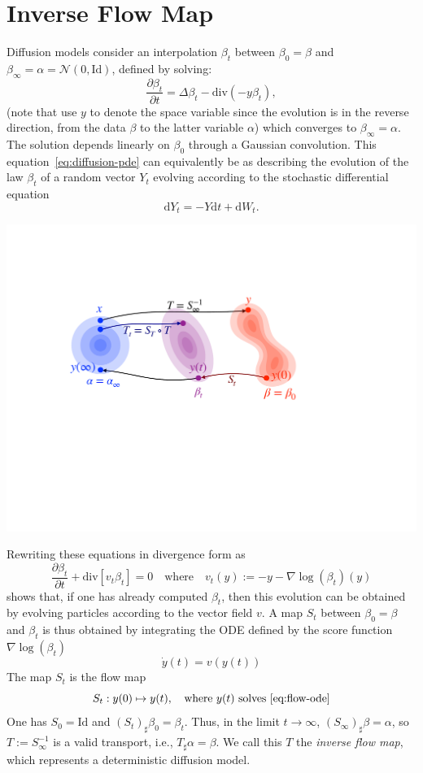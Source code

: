 \documentclass{article}
\begin{document}
\section{Inverse Flow Map}

Diffusion models consider an interpolation $\beta_t$ between $\beta_0 = \beta$ and $\beta_\infty = \alpha = \mathcal{N}(0,\text{Id})$, defined by solving:
\begin{equation}\label{eq:diffusion-pde}
    \frac{\partial \beta_t}{\partial t} = \Delta \beta_t - \text{div}(-y \beta_t) ,
\end{equation}
(note that use $y$ to denote the space variable since the evolution is in the reverse direction, from the data $\beta$ to the latter variable $\alpha$) which converges to $\beta_\infty = \alpha$. The solution depends linearly on $\beta_0$ through a Gaussian convolution.
%
This equation~\eqref{eq:diffusion-pde} can equivalently be as describing the evolution of the law $\beta_t$ of a random vector $Y_t$ evolving according to the stochastic differential equation
$$
	\mathrm{d}Y_t = -Y \mathrm{d}t + \mathrm{d}W_t.
$$

\begin{center}
\includegraphics[width=.63\linewidth]{fig-interp.pdf}
\end{center}

Rewriting these equations in divergence form as
$$
	\frac{\partial \beta_t}{\partial t} + \text{div}[ v_t \beta_t ] = 0
	\quad\text{where}\quad v_t(y) := - y - \nabla \log(\beta_t)(y)
$$
shows that, if one has already computed $\beta_t$, then this evolution can be obtained by evolving particles according to the vector field $v$. 
%
A map $S_t$ between $\beta_0=\beta$ and $\beta_t$ is thus obtained by integrating the ODE defined by the score function $\nabla \log(\beta_t)$
\begin{equation}\label{eq:flow-ode}
    \dot{y}(t) = v(y(t)) %
\end{equation}
The map $S_t$ is the flow map
\begin{equation}
    S_t : y(0) \mapsto y(t), \quad \text{where } y(t) \text{ solves \eqref{eq:flow-ode}} 
\end{equation}
One has $S_0 = \text{Id}$ and $(S_t)_\sharp \beta_0 = \beta_t$. Thus, in the limit $t \to \infty$, $(S_\infty)_\sharp \beta = \alpha$, so $T := S_\infty^{-1}$ is a valid transport, i.e., $T_\sharp \alpha = \beta$. We call this $T$ the \emph{inverse flow map}, which represents a deterministic diffusion model.
\end{document}
